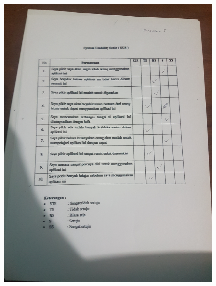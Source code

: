 \begin{figure}[H]
	\center
	\includegraphics [width = 17cm,angle=-90]{gambar/pengujian/pangkalan5}
\end{figure}
